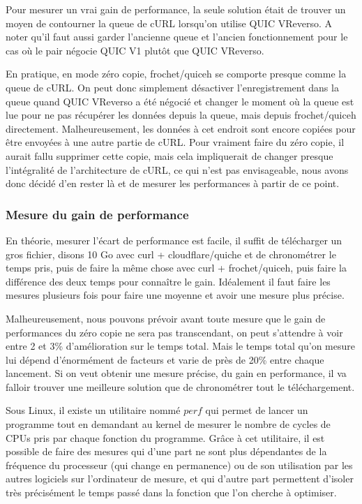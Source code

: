 Pour mesurer un vrai gain de performance, la seule solution était de trouver un moyen de contourner la queue de cURL lorsqu'on utilise QUIC VReverso. A noter qu'il faut aussi garder l'ancienne queue et l'ancien fonctionnement pour le cas où le pair négocie QUIC V1 plutôt que QUIC VReverso.

En pratique, en mode zéro copie, frochet/quiceh se comporte presque comme la queue de cURL. On peut donc simplement désactiver l'enregistrement dans la queue quand QUIC VReverso a été négocié et changer le moment où la queue est lue pour ne pas récupérer les données depuis la queue, mais depuis frochet/quiceh directement.
Malheureusement, les données à cet endroit sont encore copiées pour être envoyées à une autre partie de cURL. Pour vraiment faire du zéro copie, il aurait fallu supprimer cette copie, mais cela impliquerait de changer presque l'intégralité de l'architecture de cURL, ce qui n'est pas envisageable, nous avons donc décidé d'en rester là et de mesurer les performances à partir de ce point.

\subsubsection{Mesure du gain de performance}

En théorie, mesurer l'écart de performance est facile, il suffit de télécharger un gros fichier, disons 10 Go avec curl + cloudflare/quiche et de chronométrer le temps pris, puis de faire la même chose avec curl + frochet/quiceh, puis faire la différence des deux temps pour connaître le gain. Idéalement il faut faire les mesures plusieurs fois pour faire une moyenne et avoir une mesure plus précise.

Malheureusement, nous pouvons prévoir avant toute mesure que le gain de performances du zéro copie ne sera pas transcendant, on peut s'attendre à voir entre 2 et 3\% d'amélioration sur le temps total. Mais le temps total qu'on mesure lui dépend d'énormément de facteurs et varie de près de 20\% entre chaque lancement.
Si on veut obtenir une mesure précise, du gain en performance, il va falloir trouver une meilleure solution que de chronométrer tout le téléchargement.

\vspace{0.5cm}

Sous Linux, il existe un utilitaire nommé $perf$ qui permet de lancer un programme tout en demandant au kernel de mesurer le nombre de cycles de CPUs pris par chaque fonction du programme.
Grâce à cet utilitaire, il est possible de faire des mesures qui d'une part ne sont plus dépendantes de la fréquence du processeur (qui change en permanence) ou de son utilisation par les autres logiciels sur l'ordinateur de mesure, et qui d'autre part permettent d'isoler très précisément le temps passé dans la fonction que l'on cherche à optimiser.

